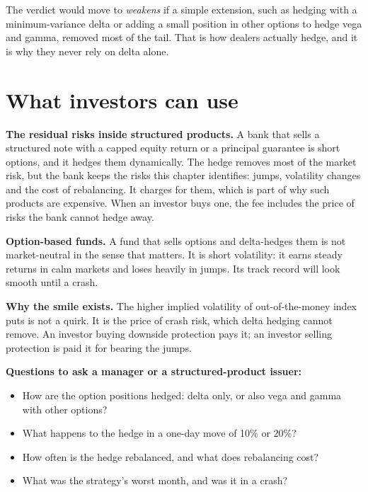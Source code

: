 The verdict would move to \emph{weakens} if a simple extension, such as hedging with a minimum-variance delta or adding a small position in other options to hedge vega and gamma, removed most of the tail. That is how dealers actually hedge, and it is why they never rely on delta alone.

\section{What investors can use}
\label{sec:15-investors}

\textbf{The residual risks inside structured products.} A bank that sells a structured note with a capped equity return or a principal guarantee is short options, and it hedges them dynamically. The hedge removes most of the market risk, but the bank keeps the risks this chapter identifies: jumps, volatility changes and the cost of rebalancing. It charges for them, which is part of why such products are expensive. When an investor buys one, the fee includes the price of risks the bank cannot hedge away.

\textbf{Option-based funds.} A fund that sells options and delta-hedges them is not market-neutral in the sense that matters. It is short volatility: it earns steady returns in calm markets and loses heavily in jumps. Its track record will look smooth until a crash.

\textbf{Why the smile exists.} The higher implied volatility of out-of-the-money index puts is not a quirk. It is the price of crash risk, which delta hedging cannot remove. An investor buying downside protection pays it; an investor selling protection is paid it for bearing the jumps.

\textbf{Questions to ask a manager or a structured-product issuer:}

\begin{itemize}
  \item How are the option positions hedged: delta only, or also vega and gamma with other options?
  \item What happens to the hedge in a one-day move of 10\% or 20\%?
  \item How often is the hedge rebalanced, and what does rebalancing cost?
  \item What was the strategy's worst month, and was it in a crash?
\end{itemize}

